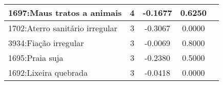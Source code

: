 \begin{table}[htbp]
\begin{tabular}{|l|c|c|c|c|}
		\hline
		1697:Maus tratos a animais               & 4                & -0.1677        & 0.6250           \\
		\hline
		1702:Aterro sanitário irregular          & 3                & -0.3067        & 0.0000           \\
		\hline
		3934:Fiação irregular                    & 3                & -0.0069        & 0.8000           \\
		\hline
		1695:Praia suja                          & 3                & -0.2380        & 0.5000           \\
		\hline
		1692:Lixeira quebrada                    & 3                & -0.0418        & 0.0000           \\
		\hline
	\end{tabular}
\end{table}

